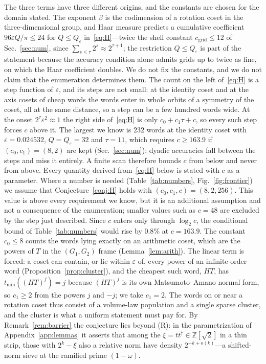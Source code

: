 \documentclass[aps,prx,twocolumn,superscriptaddress,nofootinbib,longbibliography]{revtex4-2}
\theoremstyle{plain}
\theoremstyle{definition}
\theoremstyle{remark}
\newcommand{\Z}{\mathbb{Z}}
\begin{document}
The three terms have three different origins, and the constants are chosen for the domain stated. The exponent $\beta$ is the codimension of a rotation coset in the three-dimensional group, and Haar measure predicts a cumulative coefficient $96\varepsilon Q/\pi\le24$ for $Q\le Q_\varepsilon$ in~\eqref{eq:H}---twice the shell constant $c_{\mathrm{grid}}\le12$ of Sec.~\ref{sec:num}, since $\sum_{s\le\tau}2^s\approx2^{\tau+1}$; the restriction $Q\le Q_\varepsilon$ is part of the statement because the accuracy condition alone admits grids up to twice as fine, on which the Haar coefficient doubles. We do not fix the constants, and we do not claim that the enumeration determines them. The count on the left of~\eqref{eq:H} is a step function of $\varepsilon$, and its steps are not small: at the identity coset and at the axis cosets of cheap words the words enter in whole orbits of a symmetry of the coset, all at the same distance, so a step can be a few hundred words wide. At the onset $2^\tau\varepsilon^2\approx1$ the right side of~\eqref{eq:H} is only $c_0+c_1\tau+c$, so every such step forces $c$ above it. The largest we know is $232$ words at the identity coset with $\varepsilon=0.024532$, $Q=Q_\varepsilon=32$ and $\tau=11$, which requires $c\ge163.9$ if $(c_0,c_1)=(8,2)$ are kept (Sec.~\ref{sec:num}); dyadic accuracies fall between the steps and miss it entirely. A finite scan therefore bounds $c$ from below and never from above. Every quantity derived from~\eqref{eq:H} below is stated with $c$ as a parameter. Where a number is needed (Table~\ref{tab:numbers}, Fig.~\ref{fig:frontier}) we assume that Conjecture~\ref{conj:H} holds with $(c_0,c_1,c)=(8,2,256)$. This value is above every requirement we know, but it is an additional assumption and not a consequence of the enumeration; smaller values such as $c=48$ are excluded by the step just described. Since $c$ enters only through $\log_2c$, the conditional bound of Table~\ref{tab:numbers} would rise by $0.8\%$ at $c=163.9$. The constant $c_0\le8$ counts the words lying exactly on an arithmetic coset, which are the powers of $T$ in the $(G_1,G_2)$ frame (Lemma~\ref{lem:arith}). The linear term is forced: a coset can contain, or lie within $\varepsilon$ of, every power of an infinite-order word (Proposition~\ref{prop:cluster}), and the cheapest such word, $HT$, has $t_{\min}((HT)^{j})=j$ because $(HT)^j$ is its own Matsumoto--Amano normal form, so $c_1\ge2$ from the powers $j$ and $-j$; we take $c_1=2$. The words on or near a rotation coset thus consist of a volume-law population and a single sparse cluster, and the cluster is what a uniform statement must pay for. By Remark~\ref{rem:barrier} the conjecture lies beyond (R): in the parametrization of Appendix~\ref{app:lemmas} it asserts that among the $\xi=tt^\dagger\in\Z[\sqrt2]$ in a thin strip, those with $2^k-\xi$ also a relative norm have density $2^{-k+o(k)}$---a shifted-norm sieve at the ramified prime $(1-\omega)$.
\end{document}
